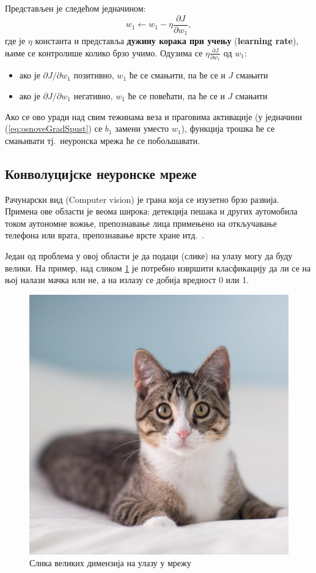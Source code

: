 \documentclass[12pt, а4paper]{article}
\begin{document}
Представљен је следећом једначином:
\begin{equation}
w_1 \leftarrow w_1 - \eta \frac{\partial J}{\partial w_1},
\label{eq:osnoveGradSpust}
\end{equation}
где је $\eta$ константа и представља \textbf{дужину корака при учењу}
(\textbf{learning rate}),
њиме се контролише колико брзо учимо. Одузима се $\eta \frac{\partial J}{\partial w_1}$
од $w_1$:
\begin{itemize}
 \item ако је $\partial J / \partial w_1$ позитивно, $w_1$ ће се
  смањити, па ће се и $J$ смањити
 \item ако је $\partial J / \partial w_1$ негативно, $w_1$ ће се
  повећати, па ће се и $J$ смањити
\end{itemize}
Ако се ово уради над свим тежинама веза и праговима активације
(у једначини (\ref{eq:osnoveGradSpust}) се $b_1$ замени уместо $w_1$),
функција трошка ће се смањивати тј.\ неуронска мрежа ће се побољшавати.

\newpage
\subsection{Конволуцијске неуронске мреже}
Рачунарски вид (Computer vision) је грана која се изузетно брзо развија.
Примена ове области је веома широка: детекција пешака и других аутомобила
током аутономне вожње, препознавање лица примењено на откључавање телефона или
врата, препознавање врсте хране итд.\ \cite{ngCVision}.

Један од проблема у овој области је да подаци (слике) на улазу могу да буду велики.
На пример, над сликом \ref{fig:macka} је потребно извршити класфикацију да ли се на њој
налази мачка или не, а на излазу се добија вредност 0 или 1.

\begin{figure}[H]
  \centering
      \includegraphics[scale=0.2]{slike/macka.jpg}
  \caption{Слика великих димензија на улазу у мрежу}
  \label{fig:macka}
\end{figure}
\end{document}
